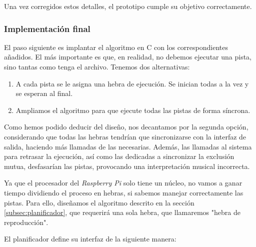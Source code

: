 Una vez corregidos estos detalles, el prototipo cumple su objetivo correctamente. 

\subsubsection{Implementación final}

El paso siguiente es implantar el algoritmo en C con los correspondientes añadidos. El más importante es que, en realidad, no debemos ejecutar una pista, sino tantas como tenga el archivo. Tenemos dos alternativas:

\begin{enumerate}
	\item A cada pista se le asigna una hebra de ejecución. Se inician todas a la vez y se esperan al final.
	\item Ampliamos el algoritmo para que ejecute todas las pistas de forma síncrona.
\end{enumerate}

Como hemos podido deducir del diseño, nos decantamos por la segunda opción, considerando que todas las hebras tendrían que sincronizarse con la interfaz de salida, haciendo más llamadas de las necesarias. Además, las llamadas al sistema para retrasar la ejecución, así como las dedicadas a sincronizar la exclusión mutua, desfasarían las pistas, provocando una interpretación musical incorrecta.

Ya que el procesador del \textit{Raspberry Pi} solo tiene un núcleo, no vamos a ganar tiempo dividiendo el proceso en hebras, si sabemos manejar correctamente las pistas. Para ello, diseñamos el algoritmo descrito en la sección \ref{subsec:planificador}, que requerirá una sola hebra, que llamaremos "hebra de reproducción".

El planificador define su interfaz de la siguiente manera:

